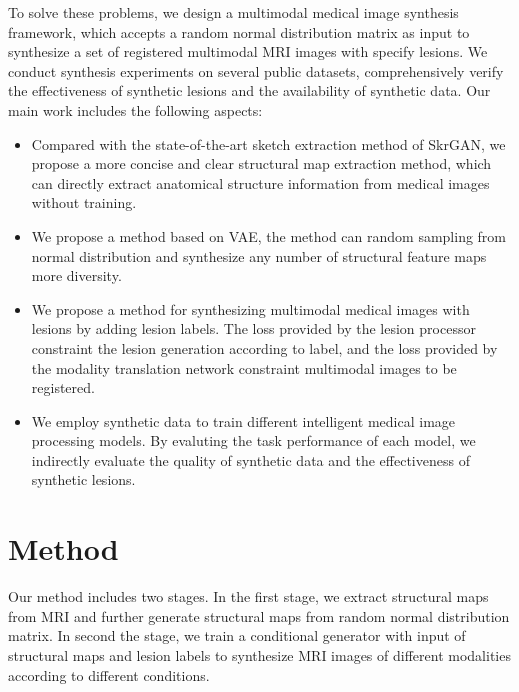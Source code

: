 \documentclass[runningheads]{llncs}
\begin{document}
	To solve these problems, we design a multimodal medical image synthesis framework, which accepts a random normal distribution matrix as input to synthesize a set of registered multimodal MRI images with specify lesions. We conduct synthesis experiments on several public datasets, comprehensively verify the effectiveness of synthetic lesions and the availability of synthetic data. Our main work includes the following aspects:
	\begin{itemize}
		\item Compared with the state-of-the-art sketch extraction method of SkrGAN, we propose a more concise and clear structural map extraction method, which can directly extract anatomical structure information from medical images without training.
		\item We propose a method based on VAE, the method can random sampling from normal distribution and synthesize any number of structural feature maps more diversity.
		\item We propose a method for synthesizing multimodal medical images with lesions by adding lesion labels. The loss provided by the lesion processor constraint the lesion generation according to label, and the loss provided by the modality translation network constraint multimodal images to be registered.
		\item We employ synthetic data to train different intelligent medical image processing models. By evaluting the task performance of each model, we indirectly evaluate the quality of synthetic data and the effectiveness of synthetic lesions.
	\end{itemize}
	
	\section{Method}
	\label{method}
	Our method includes two stages. In the first stage, we extract structural maps from MRI and further generate structural maps from random normal distribution matrix. In second the stage, we train a conditional generator with input of structural maps and lesion labels to synthesize MRI images of different modalities according to different conditions.
	
\end{document}
